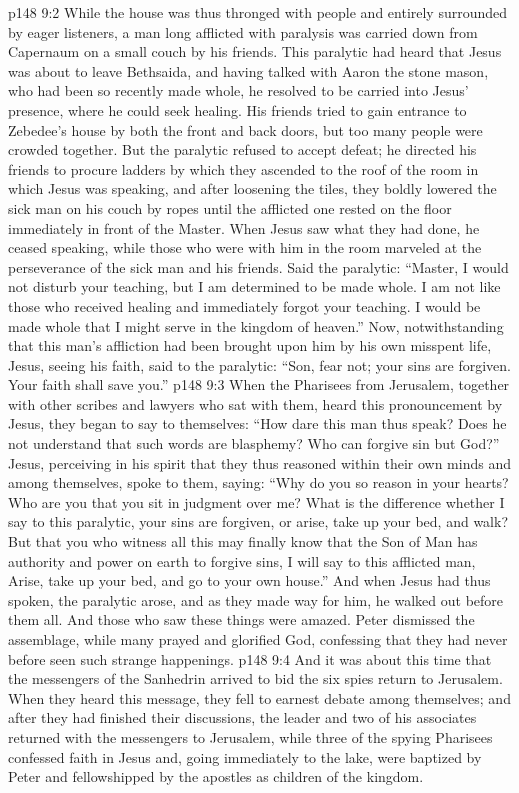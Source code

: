 \vs p148 9:2 While the house was thus thronged with people and entirely surrounded by eager listeners, a man long afflicted with paralysis was carried down from Capernaum on a small couch by his friends. This paralytic had heard that Jesus was about to leave Bethsaida, and having talked with Aaron the stone mason, who had been so recently made whole, he resolved to be carried into Jesus’ presence, where he could seek healing. His friends tried to gain entrance to Zebedee’s house by both the front and back doors, but too many people were crowded together. But the paralytic refused to accept defeat; he directed his friends to procure ladders by which they ascended to the roof of the room in which Jesus was speaking, and after loosening the tiles, they boldly lowered the sick man on his couch by ropes until the afflicted one rested on the floor immediately in front of the Master. When Jesus saw what they had done, he ceased speaking, while those who were with him in the room marveled at the perseverance of the sick man and his friends. Said the paralytic: “Master, I would not disturb your teaching, but I am determined to be made whole. I am not like those who received healing and immediately forgot your teaching. I would be made whole that I might serve in the kingdom of heaven.” Now, notwithstanding that this man’s affliction had been brought upon him by his own misspent life, Jesus, seeing his faith, said to the paralytic: \textcolor{ubdarkred}{“Son, fear not; your sins are forgiven. Your faith shall save you.”}
\vs p148 9:3 When the Pharisees from Jerusalem, together with other scribes and lawyers who sat with them, heard this pronouncement by Jesus, they began to say to themselves: “How dare this man thus speak? Does he not understand that such words are blasphemy? Who can forgive sin but God?” Jesus, perceiving in his spirit that they thus reasoned within their own minds and among themselves, spoke to them, saying: \textcolor{ubdarkred}{“Why do you so reason in your hearts? Who are you that you sit in judgment over me? What is the difference whether I say to this paralytic, your sins are forgiven, or arise, take up your bed, and walk? But that you who witness all this may finally know that the Son of Man has authority and power on earth to forgive sins, I will say to this afflicted man, Arise, take up your bed, and go to your own house.”} And when Jesus had thus spoken, the paralytic arose, and as they made way for him, he walked out before them all. And those who saw these things were amazed. Peter dismissed the assemblage, while many prayed and glorified God, confessing that they had never before seen such strange happenings.\plusone
\pc \vs p148 9:4 And it was about this time that the messengers of the Sanhedrin arrived to bid the six spies return to Jerusalem. When they heard this message, they fell to earnest debate among themselves; and after they had finished their discussions, the leader and two of his associates returned with the messengers to Jerusalem, while three of the spying Pharisees confessed faith in Jesus and, going immediately to the lake, were baptized by Peter and fellowshipped by the apostles as children of the kingdom.
